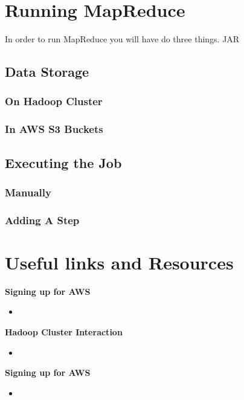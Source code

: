 \documentclass{article}
\begin{document}
\section{Running MapReduce}
In order to run MapReduce you will have do three things. JAR
\subsection{Data Storage}
\subsubsection{On Hadoop Cluster}
\subsubsection{In AWS S3 Buckets}
\subsection{Executing the Job}
\subsubsection{Manually}
\subsubsection{Adding A Step}


\section{Useful links and Resources}
\textbf{Signing up for AWS}
\begin{itemize}
\item 
\end{itemize}
\textbf{Hadoop Cluster Interaction}
\begin{itemize}
\item 
\end{itemize}
\textbf{Signing up for AWS}
\begin{itemize}
\item 
\end{itemize}


%
\end{document}
